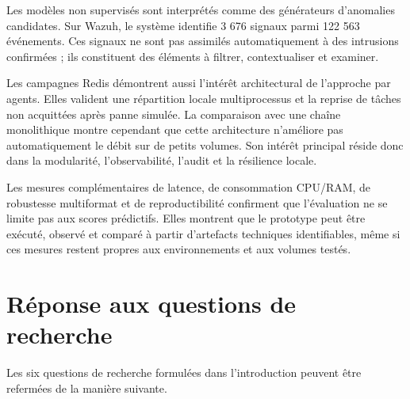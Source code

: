 Les modèles non supervisés sont interprétés comme des générateurs d'anomalies candidates. Sur Wazuh, le système identifie 3 676 signaux parmi 122 563 événements. Ces signaux ne sont pas assimilés automatiquement à des intrusions confirmées ; ils constituent des éléments à filtrer, contextualiser et examiner.

Les campagnes Redis démontrent aussi l'intérêt architectural de l'approche par agents. Elles valident une répartition locale multiprocessus et la reprise de tâches non acquittées après panne simulée. La comparaison avec une chaîne monolithique montre cependant que cette architecture n'améliore pas automatiquement le débit sur de petits volumes. Son intérêt principal réside donc dans la modularité, l'observabilité, l'audit et la résilience locale.

Les mesures complémentaires de latence, de consommation CPU/RAM, de robustesse multiformat et de reproductibilité confirment que l'évaluation ne se limite pas aux scores prédictifs. Elles montrent que le prototype peut être exécuté, observé et comparé à partir d'artefacts techniques identifiables, même si ces mesures restent propres aux environnements et aux volumes testés.

\section{Réponse aux questions de recherche}

Les six questions de recherche formulées dans l'introduction peuvent être refermées de la manière suivante.

